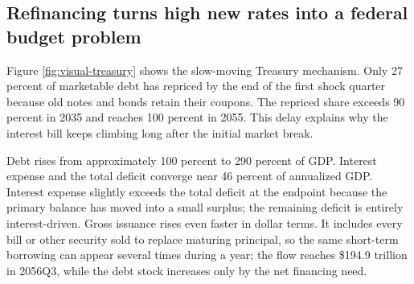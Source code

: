 \documentclass[11pt]{article}
\begin{document}
\FloatBarrier

\subsection*{Refinancing turns high new rates into a federal budget problem}

Figure \ref{fig:visual-treasury} shows the slow-moving Treasury mechanism.  Only 27 percent
of marketable debt has repriced by the end of the first shock quarter because old notes and
bonds retain their coupons.  The repriced share exceeds 90 percent in 2035 and reaches 100
percent in 2055.  This delay explains why the interest bill keeps climbing long after the
initial market break.

Debt rises from approximately 100 percent to 290 percent of GDP.  Interest expense and the
total deficit converge near 46 percent of annualized GDP.  Interest expense slightly exceeds
the total deficit at the endpoint because the primary balance has moved into a small surplus;
the remaining deficit is entirely interest-driven.  Gross issuance rises even faster in
dollar terms.  It includes every bill or other security sold to replace maturing principal,
so the same short-term borrowing can appear several times during a year; the flow reaches
\$194.9 trillion in 2056Q3, while the debt stock increases only by the net financing need.
\end{document}
